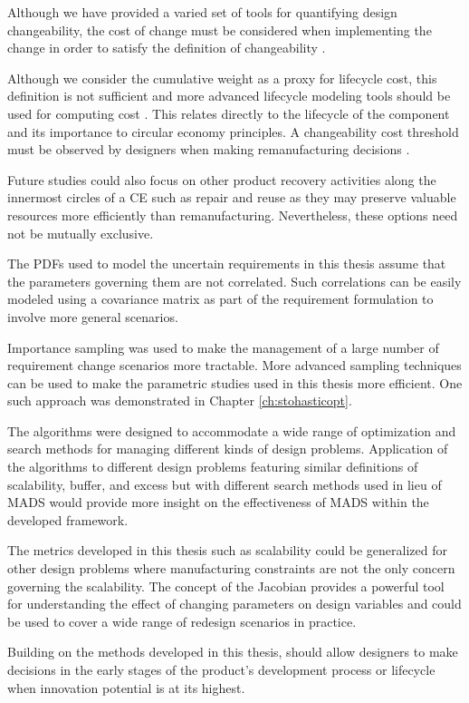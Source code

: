 Although we have provided a varied set of tools for quantifying design changeability, the cost of change must be considered when implementing the change in order to satisfy the definition of changeability \cite{Lawand2019}.

Although we consider the cumulative weight as a proxy for lifecycle cost, this definition is not sufficient and more advanced lifecycle modeling tools should be used for computing cost \cite{Lawand2019}. This relates directly to the lifecycle of the component and its importance to circular economy principles. A changeability cost threshold must be observed by designers when making remanufacturing decisions \cite{Ross2008}. 

Future studies could also focus on other product recovery activities along the innermost circles of a \ac{CE} such as repair and reuse as they may preserve valuable resources more efficiently than remanufacturing. Nevertheless, these options need not be mutually exclusive.

The \acp{PDF} used to model the uncertain requirements in this thesis assume that the parameters governing them are not correlated. Such correlations can be easily modeled using a covariance matrix as part of the requirement formulation to involve more general scenarios. 

Importance sampling was used to make the management of a large number of requirement change scenarios more tractable. More advanced sampling techniques can be used to make the parametric studies used in this thesis more efficient. One such approach was demonstrated in Chapter \ref{ch:stohasticopt}.

The algorithms were designed to accommodate a wide range of optimization and search methods for managing different kinds of design problems. Application of the algorithms to different design problems featuring similar definitions of scalability, buffer, and excess but with different search methods used in lieu of \ac{MADS} would provide more insight on the effectiveness of \ac{MADS} within the developed framework.

The metrics developed in this thesis such as scalability could be generalized for other design problems where manufacturing constraints are not the only concern governing the scalability. The concept of the Jacobian provides a powerful tool for understanding the effect of changing parameters on design variables and could be used to cover a wide range of redesign scenarios in practice.

Building on the methods developed in this thesis, should allow designers to make decisions in the early stages of the product's development process or lifecycle when innovation potential is at its highest.
